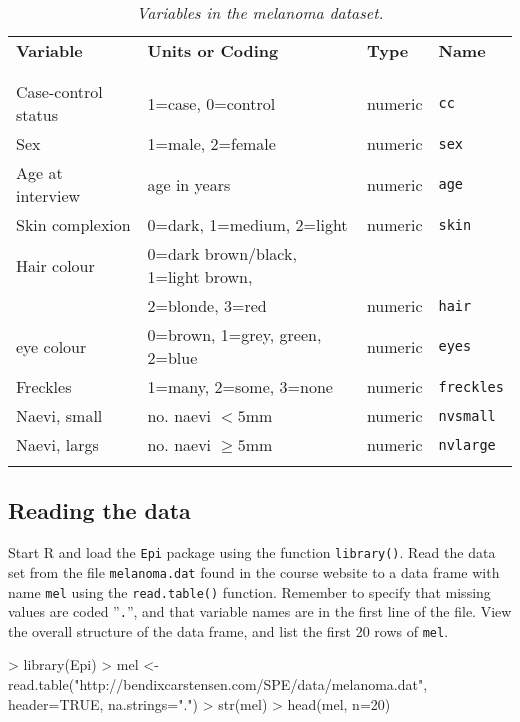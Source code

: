 \begin{table}[h]
\begin{center}
\caption{\label{tab:meldat}
  \it Variables in the melanoma dataset.} 
\begin{tabular}{@{\extracolsep{1em}}llll}\\
{\bf Variable} & {\bf Units or Coding} & {\bf Type} & {\bf Name}\\
\\ \hline \\
 Case-control status &  1=case, 0=control & numeric & {\tt cc} \\
 Sex & 1=male, 2=female & numeric & {\tt sex} \\
 Age at interview & age in years & numeric & {\tt age} \\
 Skin complexion & 0=dark, 1=medium, 2=light & numeric & {\tt skin} \\
 Hair colour & 0=dark brown/black, 1=light brown, \\
             & 2=blonde, 3=red & numeric & {\tt hair} \\
 eye colour & 0=brown, 1=grey, green, 2=blue & numeric & {\tt eyes} \\
 Freckles & 1=many, 2=some, 3=none & numeric & {\tt freckles} \\
 Naevi, small & no. naevi $<5$mm & numeric & {\tt nvsmall} \\
 Naevi, largs & no. naevi $\ge 5$mm & numeric & {\tt nvlarge} \\ \\
\hline
\end{tabular}
\end{center}
\end{table}

\subsection{Reading the data}
Start R and
load the {\tt Epi} package using the function {\tt library()}. 
Read the data set from the file {\tt melanoma.dat} found in the course website
to a data frame with name {\tt mel} using the {\tt read.table()} function.
Remember to specify that missing values are coded ''{\tt .}'', and 
that variable names are in the first line of the file.
View the overall structure of the data frame, and list the first 20 rows of {\tt mel}.

\begin{Schunk}
\begin{Sinput}
> library(Epi)
> mel <- read.table("http://bendixcarstensen.com/SPE/data/melanoma.dat", header=TRUE, na.strings=".")
> str(mel)
> head(mel, n=20)
\end{Sinput}
\end{Schunk}

